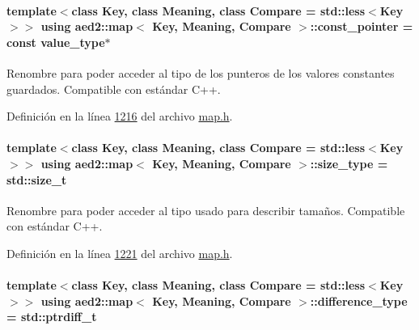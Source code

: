 \paragraph[{\texorpdfstring{const\+\_\+pointer}{const_pointer}}]{\setlength{\rightskip}{0pt plus 5cm}template$<$class Key, class Meaning, class Compare = std\+::less$<$\+Key$>$$>$ using {\bf aed2\+::map}$<$ Key, Meaning, Compare $>$\+::{\bf const\+\_\+pointer} =  const {\bf value\+\_\+type}$\ast$}\hypertarget{classaed2_1_1map_a1366fc3e227a49777cb748fc6d4e022b_a1366fc3e227a49777cb748fc6d4e022b}{}\label{classaed2_1_1map_a1366fc3e227a49777cb748fc6d4e022b_a1366fc3e227a49777cb748fc6d4e022b}


Renombre para poder acceder al tipo de los punteros de los valores constantes guardados. Compatible con estándar C++. 



Definición en la línea \hyperlink{map_8h_source_l01216}{1216} del archivo \hyperlink{map_8h_source}{map.\+h}.

\paragraph[{\texorpdfstring{size\+\_\+type}{size_type}}]{\setlength{\rightskip}{0pt plus 5cm}template$<$class Key, class Meaning, class Compare = std\+::less$<$\+Key$>$$>$ using {\bf aed2\+::map}$<$ Key, Meaning, Compare $>$\+::{\bf size\+\_\+type} =  std\+::size\+\_\+t}\hypertarget{classaed2_1_1map_a8cf1c570f605e9c0ad6feb8ce12c9400_a8cf1c570f605e9c0ad6feb8ce12c9400}{}\label{classaed2_1_1map_a8cf1c570f605e9c0ad6feb8ce12c9400_a8cf1c570f605e9c0ad6feb8ce12c9400}


Renombre para poder acceder al tipo usado para describir tamaños. Compatible con estándar C++. 



Definición en la línea \hyperlink{map_8h_source_l01221}{1221} del archivo \hyperlink{map_8h_source}{map.\+h}.

\paragraph[{\texorpdfstring{difference\+\_\+type}{difference_type}}]{\setlength{\rightskip}{0pt plus 5cm}template$<$class Key, class Meaning, class Compare = std\+::less$<$\+Key$>$$>$ using {\bf aed2\+::map}$<$ Key, Meaning, Compare $>$\+::{\bf difference\+\_\+type} =  std\+::ptrdiff\+\_\+t}\hypertarget{classaed2_1_1map_a2f55b88809000fcbfce1c6cfef1ba74d_a2f55b88809000fcbfce1c6cfef1ba74d}{}\label{classaed2_1_1map_a2f55b88809000fcbfce1c6cfef1ba74d_a2f55b88809000fcbfce1c6cfef1ba74d}


